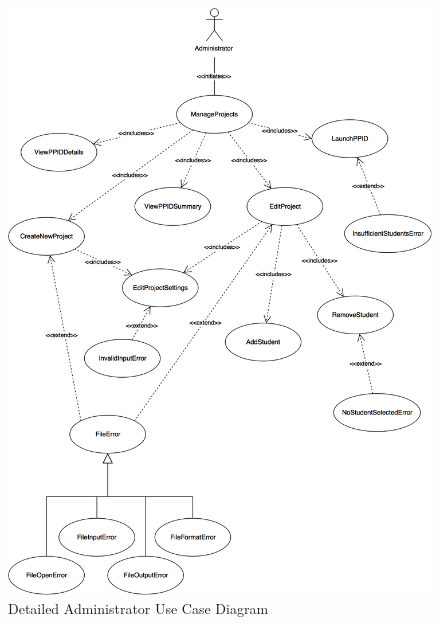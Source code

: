 \documentclass[12pt,letterpaper]{article}
\begin{document}
\begin{figure}[H]
	\centering{}
	\includegraphics[scale=0.23]{imgs/Administrator-Use-Case.png}
	\caption{Detailed Administrator Use Case Diagram}
\end{figure}
\end{document}
